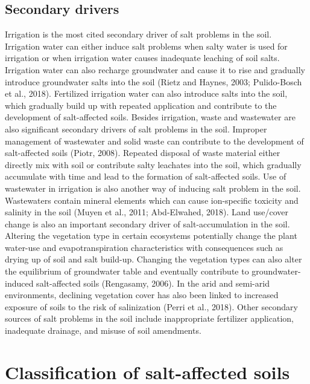 \documentclass[
  10pt,
  b5paper,
]{book}
\begin{document}
\hypertarget{secondary-drivers}{%
\subsection{Secondary drivers}\label{secondary-drivers}}

Irrigation is the most cited secondary driver of salt problems in the soil. Irrigation water can either induce salt problems when salty water is used for irrigation or when irrigation water causes inadequate leaching of soil salts. Irrigation water can also recharge groundwater and cause it to rise and gradually introduce groundwater salts into the soil (Rietz and Haynes, 2003; Pulido-Bosch et al., 2018). Fertilized irrigation water can also introduce salts into the soil, which gradually build up with repeated application and contribute to the development of salt-affected soils.
Besides irrigation, waste and wastewater are also significant secondary drivers of salt problems in the soil. Improper management of wastewater and solid waste can contribute to the development of salt-affected soils (Piotr, 2008). Repeated disposal of waste material either directly mix with soil or contribute salty leachates into the soil, which gradually accumulate with time and lead to the formation of salt-affected soils. Use of wastewater in irrigation is also another way of inducing salt problem in the soil. Wastewaters contain mineral elements which can cause ion-specific toxicity and salinity in the soil (Muyen et al., 2011; Abd-Elwahed, 2018).
Land use/cover change is also an important secondary driver of salt-accumulation in the soil. Altering the vegetation type in certain ecosystems potentially change the plant water-use and evapotranspiration characteristics with consequences such as drying up of soil and salt build-up. Changing the vegetation types can also alter the equilibrium of groundwater table and eventually contribute to groundwater-induced salt-affected soils (Rengasamy, 2006). In the arid and semi-arid environments, declining vegetation cover has also been linked to increased exposure of soils to the risk of salinization (Perri et al., 2018).
Other secondary sources of salt problems in the soil include inappropriate fertilizer application, inadequate drainage, and misuse of soil amendments.

\hypertarget{classification-of-salt-affected-soils}{%
\section{Classification of salt-affected soils}\label{classification-of-salt-affected-soils}}
\end{document}
